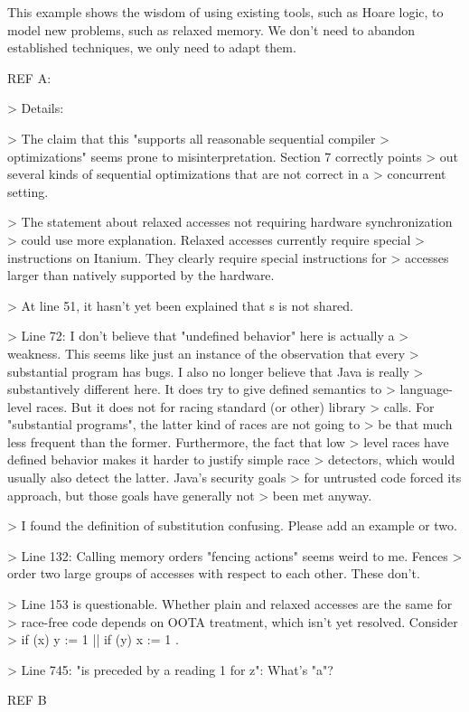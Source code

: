 \documentclass[acmsmall,review,screen]{acmart}\settopmatter{printfolios=true}
\theoremstyle{acmdefinition}
\begin{document}
This example shows the wisdom of using existing tools, such as Hoare logic,
to model new problems, such as relaxed memory.  We don't need to abandon
established techniques, we only need to adapt them.

REF A:

> Details:

> The claim that this "supports all reasonable sequential compiler
> optimizations" seems prone to misinterpretation. Section 7 correctly points
> out several kinds of sequential optimizations that are not correct in a
> concurrent setting. 

> The statement about relaxed accesses not requiring hardware synchronization
> could use more explanation. Relaxed accesses currently require special
> instructions on Itanium. They clearly require special instructions for
> accesses larger than natively supported by the hardware. 

> At line 51, it hasn't yet been explained that s is not shared.

> Line 72: I don't believe that "undefined behavior" here is actually a
> weakness. This seems like just an instance of the observation that every
> substantial program has bugs. I also no longer believe that Java is really
> substantively different here. It does try to give defined semantics to
> language-level races. But it does not for racing standard (or other) library
> calls. For "substantial programs", the latter kind of races are not going to
> be that much less frequent than the former. Furthermore, the fact that low
> level races have defined behavior makes it harder to justify simple race
> detectors, which would usually also detect the latter. Java's security goals
> for untrusted code forced its approach, but those goals have generally not
> been met anyway. 

> I found the definition of substitution confusing. Please add an example or two.

> Line 132: Calling memory orders "fencing actions" seems weird to me. Fences
> order two large groups of accesses with respect to each other. These don't.  

> Line 153 is questionable. Whether plain and relaxed accesses are the same for
> race-free code depends on OOTA treatment, which isn't yet resolved. Consider
> if (x) y := 1 || if (y) x := 1 . 

> Line 745: "is preceded by a reading 1 for z": What's "a"?


REF B
\end{document}
